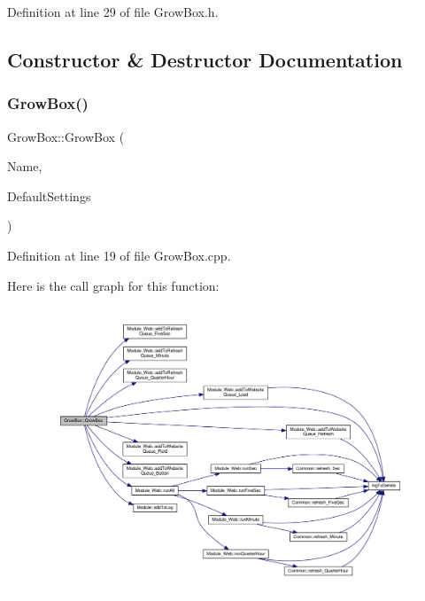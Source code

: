 Definition at line 29 of file Grow\+Box.\+h.



\subsection{Constructor \& Destructor Documentation}
\mbox{\label{class_grow_box_a56729a0c282ec48e356c99d1c66b2266}} 
\subsubsection{\texorpdfstring{Grow\+Box()}{GrowBox()}\hspace{0.1cm}{\footnotesize\ttfamily [1/2]}}
{\footnotesize\ttfamily Grow\+Box\+::\+Grow\+Box (\begin{DoxyParamCaption}\item[{const \+\_\+\+\_\+\+Flash\+String\+Helper $\ast$}]{Name,  }\item[{\hyperlink{struct_settings_1_1_grow_box_settings}{Settings\+::\+Grow\+Box\+Settings} $\ast$}]{Default\+Settings }\end{DoxyParamCaption})}



Definition at line 19 of file Grow\+Box.\+cpp.

Here is the call graph for this function\+:
\nopagebreak
\begin{figure}[H]
\begin{center}
\leavevmode
\includegraphics[width=350pt]{class_grow_box_a56729a0c282ec48e356c99d1c66b2266_cgraph}
\end{center}
\end{figure}
\mbox{\label{class_grow_box_a56729a0c282ec48e356c99d1c66b2266}} 
